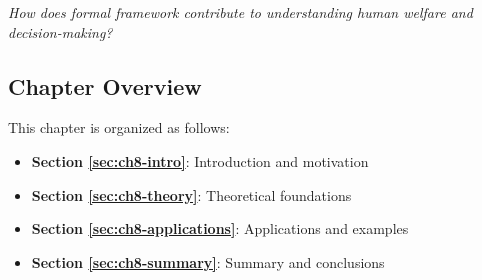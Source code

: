 \begin{tcolorbox}[
    colback=red!5!white,
    colframe=red!75!black,
    title={\textbf{Central Question}},
    fonttitle=\bfseries
]
\Large
\centering
\textit{How does formal framework contribute to understanding human welfare and decision-making?}
\end{tcolorbox}



\subsection*{Chapter Overview}

This chapter is organized as follows:

\begin{itemize}
\item \textbf{Section \ref{sec:ch8-intro}}: Introduction and motivation
\item \textbf{Section \ref{sec:ch8-theory}}: Theoretical foundations
\item \textbf{Section \ref{sec:ch8-applications}}: Applications and examples
\item \textbf{Section \ref{sec:ch8-summary}}: Summary and conclusions
\end{itemize}




